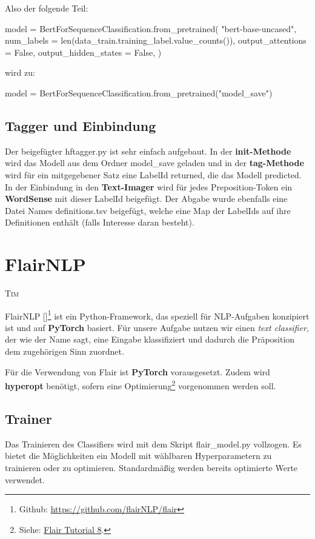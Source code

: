 \documentclass[10pt,a4paper]{article}
\newcommand{\chapterauthor}[1]{%
	{\parindent0pt\vspace*{-5pt}\hspace*{\fill}%
  \linespread{1.1}\large\scshape#1%
  \par\nobreak\vspace*{10pt}}
}
\begin{document}
Also der folgende Teil:
\begin{python}
model = BertForSequenceClassification.from_pretrained(
    "bert-base-uncased", 
    num_labels = len(data_train.training_label.value_counts()), 
    output_attentions = False, 
    output_hidden_states = False, 
)
\end{python}
wird zu:
\begin{python}
model = BertForSequenceClassification.from_pretrained("model_save")
\end{python}


\subsection{Tagger und Einbindung}
Der beigefügter hftagger.py ist sehr einfach aufgebaut. In der \textbf{init-Methode} wird das Modell aus dem Ordner model\_save geladen und in der \textbf{tag-Methode} wird für ein mitgegebener Satz eine LabelId returned, die das Modell predicted. In der Einbindung in den \textbf{Text-Imager} wird für jedes Preposition-Token ein \textbf{WordSense} mit dieser LabelId beigefügt. Der Abgabe wurde ebenfalls eine Datei Names definitions.tsv beigefügt, welche eine Map der LabelIds auf ihre Definitionen enthält (falls Interesse daran besteht).

\newpage

\section{FlairNLP}
\chapterauthor{Tim}
FlairNLP [\cite{flair}]\footnote{Github: \url{https://github.com/flairNLP/flair}} ist ein Python-Framework, das speziell für NLP-Aufgaben konzipiert ist und auf \textbf{PyTorch} basiert. Für unsere Aufgabe nutzen wir einen \textit{text classifier}, der wie der Name sagt, eine Eingabe klassifiziert und dadurch die Präposition dem zugehörigen Sinn zuordnet.

Für die Verwendung von Flair ist \textbf{PyTorch} vorausgesetzt. Zudem wird \textbf{hyperopt} benötigt, sofern eine Optimierung\footnote{Siehe: \href{https://github.com/flairNLP/flair/blob/master/resources/docs/TUTORIAL_8_MODEL_OPTIMIZATION.md}{Flair Tutorial 8}.} vorgenommen werden soll.

\subsection{Trainer}

\begin{flushleft}
Das Trainieren des Classifiers wird mit dem Skript flair\_model.py vollzogen. Es bietet die Möglichkeiten ein Modell mit wählbaren Hyperparametern zu trainieren oder zu optimieren. Standardmäßig werden bereits optimierte Werte verwendet.
\end{flushleft}
\end{document}
